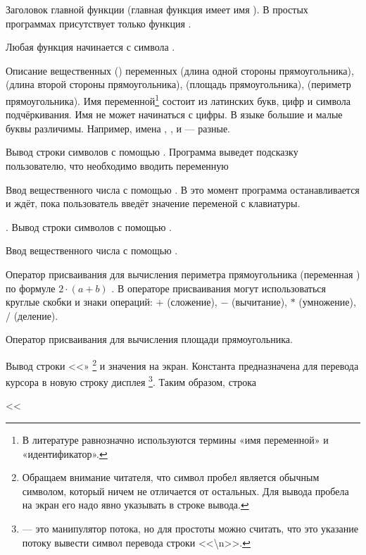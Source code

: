  Заголовок главной функции (главная функция имеет имя ). В простых программах
присутствует только функция .

 Любая функция начинается с символа \Sys{\{}.

 Описание вещественных () переменных  (длина одной стороны
прямоугольника),  (длина второй стороны прямоугольника),  (площадь
прямоугольника),  (периметр прямоугольника). Имя переменной\footnote{В 
литературе равнозначно используются термины «имя переменной» и
«идентификатор».} состоит из латинских букв, цифр и символа подчёркивания. Имя не может начинаться
с цифры. В языке  большие и малые буквы различимы. Например, имена ,
,  и  --- разные.

 Вывод строки символов  с помощью . Программа выведет
подсказку пользователю, что необходимо вводить переменную 

 Ввод вещественного числа  с помощью . В это момент
программа останавливается и ждёт, пока пользователь введёт значение переменой  с клавиатуры.

. Вывод строки символов  с помощью .

 Ввод вещественного числа  с помощью .

 Оператор присваивания для вычисления периметра прямоугольника (переменная ) по
формуле  $2\cdot(a+b)$ . В операторе присваивания могут использоваться круглые скобки и знаки операций: $+$ (сложение),
$-$ (вычитание), $*$ (умножение), / (деление).

 Оператор присваивания для вычисления площади прямоугольника.

 Вывод строки <<»%
\footnote{Обращаем внимание читателя, что символ пробел является обычным
символом, который ничем не отличается от остальных. Для вывода пробела на экран его надо явно указывать в строке
вывода.}
и значения  на экран.
Константа  предназначена для перевода курсора в новую строку дисплея%
\footnote{
 --- это манипулятор потока, но для простоты можно считать,
что это указание потоку вывести символ перевода строки <<\textbackslash{n}>>.
}.
Таким образом, строка

 {<}{<} 

